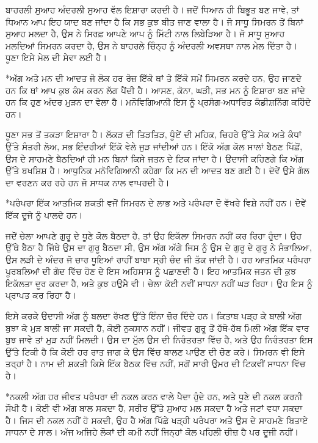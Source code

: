 \documentclass[12pt,a5paper,twoside]{book}  %
\makeatletter
\renewcommand\section{\@startsection{section}{1}{0pt}{1.2em}{0.6em}{\punjabifont\Large\bfseries}}%
\renewcommand\subsection{\@startsection{subsection}{2}{0pt}{1em}{0.5em}{\punjabifont\large\bfseries}}%
\makeatother
\begin{document}
{ਬਾਹਰਲੀ ਸੁਆਹ ਅੰਦਰਲੀ ਸੁਆਹ ਵੱਲ ਇਸ਼ਾਰਾ ਕਰਦੀ ਹੈ। ਜਦੋਂ ਧਿਆਨ ਹੀ ਬਿਭੂਤ ਬਣ ਜਾਵੇ, ਤਾਂ ਧਿਆਨ ਆਪ ਇਹ ਯਾਦ ਬਣ ਜਾਂਦਾ ਹੈ ਕਿ ਸਭ ਕੁਝ ਬੀਤ ਜਾਣ ਵਾਲਾ ਹੈ। ਜੋ ਸਾਧੂ ਸਿਮਰਨ ਤੋਂ ਬਿਨਾਂ ਸੁਆਹ ਮਲਦਾ ਹੈ, ਉਸ ਨੇ ਸਿਰਫ਼ ਆਪਣੇ ਆਪ ਨੂੰ ਮਿੱਟੀ ਨਾਲ ਲਿਬੇੜਿਆ ਹੈ। ਜੋ ਸਾਧੂ ਸੁਆਹ ਮਲਦਿਆਂ ਸਿਮਰਨ ਕਰਦਾ ਹੈ, ਉਸ ਨੇ ਬਾਹਰਲੇ ਚਿੰਨ੍ਹ ਨੂੰ ਅੰਦਰਲੀ ਅਵਸਥਾ ਨਾਲ ਮੇਲ ਦਿੱਤਾ ਹੈ। ਧੂਣਾ ਇਸੇ ਮੇਲ ਦੀ ਸੇਵਾ ਲਈ ਹੈ।


\subsection*{ਅੱਗ ਅਤੇ ਮਨ ਦੀ ਆਦਤ}
ਜੋ ਲੋਕ ਹਰ ਰੋਜ਼ ਇੱਕੋ ਥਾਂ ਤੇ ਇੱਕੋ ਸਮੇਂ ਸਿਮਰਨ ਕਰਦੇ ਹਨ, ਉਹ ਜਾਣਦੇ ਹਨ ਕਿ ਥਾਂ ਆਪ ਕੁਝ ਕੰਮ ਕਰਨ ਲੱਗ ਪੈਂਦੀ ਹੈ। ਆਸਣ, ਕੋਨਾ, ਘੜੀ, ਸਭ ਮਨ ਨੂੰ ਇਸ਼ਾਰਾ ਬਣ ਜਾਂਦੇ ਹਨ ਕਿ ਹੁਣ ਅੰਦਰ ਮੁੜਨ ਦਾ ਵੇਲਾ ਹੈ। ਮਨੋਵਿਗਿਆਨੀ ਇਸ ਨੂੰ ਪ੍ਰਸੰਗ-ਅਧਾਰਿਤ ਕੰਡੀਸ਼ਨਿੰਗ ਕਹਿੰਦੇ ਹਨ।

ਧੂਣਾ ਸਭ ਤੋਂ ਤਕੜਾ ਇਸ਼ਾਰਾ ਹੈ। ਲੱਕੜ ਦੀ ਤਿੜਤਿੜ, ਧੂੰਏਂ ਦੀ ਮਹਿਕ, ਚਿਹਰੇ ਉੱਤੇ ਸੇਕ ਅਤੇ ਕੰਧਾਂ ਉੱਤੇ ਸੰਤਰੀ ਲੋਅ, ਸਭ ਇੰਦਰੀਆਂ ਇੱਕੋ ਵੇਲੇ ਜੁੜ ਜਾਂਦੀਆਂ ਹਨ। ਇੱਕੋ ਅੱਗ ਕੋਲ ਸਾਲਾਂ ਬੈਠਣ ਪਿੱਛੋਂ, ਉਸ ਦੇ ਸਾਹਮਣੇ ਬੈਠਦਿਆਂ ਹੀ ਮਨ ਬਿਨਾਂ ਕਿਸੇ ਜਤਨ ਦੇ ਟਿਕ ਜਾਂਦਾ ਹੈ। ਉਦਾਸੀ ਕਹਿਣਗੇ ਕਿ ਅੱਗ ਉੱਤੇ ਬਖਸ਼ਿਸ਼ ਹੈ। ਆਧੁਨਿਕ ਮਨੋਵਿਗਿਆਨੀ ਕਹੇਗਾ ਕਿ ਮਨ ਦੀ ਆਦਤ ਬਣ ਗਈ ਹੈ। ਦੋਵੇਂ ਉਸੇ ਗੱਲ ਦਾ ਵਰਣਨ ਕਰ ਰਹੇ ਹਨ ਜੋ ਸਾਧਕ ਨਾਲ ਵਾਪਰਦੀ ਹੈ।


\section*{ਪਰੰਪਰਾ ਇੱਕ ਆਤਮਿਕ ਸ਼ਕਤੀ ਵਜੋਂ}
ਸਿਮਰਨ ਦੇ ਲਾਭ ਅਤੇ ਪਰੰਪਰਾ ਦੋ ਵੱਖਰੇ ਵਿਸ਼ੇ ਨਹੀਂ ਹਨ। ਦੋਵੇਂ ਇੱਕ ਦੂਜੇ ਨੂੰ ਪਾਲਦੇ ਹਨ।

ਜਦੋਂ ਚੇਲਾ ਆਪਣੇ ਗੁਰੂ ਦੇ ਧੂਣੇ ਕੋਲ ਬੈਠਦਾ ਹੈ, ਤਾਂ ਉਹ ਇਕੱਲਾ ਸਿਮਰਨ ਨਹੀਂ ਕਰ ਰਿਹਾ ਹੁੰਦਾ। ਉਹ ਉੱਥੇ ਬੈਠਾ ਹੈ ਜਿੱਥੇ ਉਸ ਦਾ ਗੁਰੂ ਬੈਠਦਾ ਸੀ, ਉਸ ਅੱਗ ਅੱਗੇ ਜਿਸ ਨੂੰ ਉਸ ਦੇ ਗੁਰੂ ਦੇ ਗੁਰੂ ਨੇ ਸੰਭਾਲਿਆ, ਉਸ ਲੜੀ ਦੇ ਅੰਦਰ ਜੋ ਚਾਰ ਧੂਇਆਂ ਰਾਹੀਂ ਬਾਬਾ ਸ੍ਰੀ ਚੰਦ ਜੀ ਤੱਕ ਜਾਂਦੀ ਹੈ। ਹਰ ਆਤਮਿਕ ਪਰੰਪਰਾ ਪੂਰਬਲਿਆਂ ਦੀ ਗੋਦ ਵਿੱਚ ਹੋਣ ਦੇ ਇਸ ਅਹਿਸਾਸ ਨੂੰ ਪਛਾਣਦੀ ਹੈ। ਇਹ ਆਤਮਿਕ ਜਤਨ ਦੀ ਕੁਝ ਇਕੱਲਤਾ ਦੂਰ ਕਰਦਾ ਹੈ, ਅਤੇ ਕੁਝ ਹਉਮੈ ਵੀ। ਚੇਲਾ ਕੋਈ ਨਵੀਂ ਸਾਧਨਾ ਨਹੀਂ ਘੜ ਰਿਹਾ। ਉਹ ਇਸ ਨੂੰ ਪ੍ਰਾਪਤ ਕਰ ਰਿਹਾ ਹੈ।

ਇਸੇ ਕਰਕੇ ਉਦਾਸੀ ਅੱਗ ਨੂੰ ਬਲਦਾ ਰੱਖਣ ਉੱਤੇ ਇੰਨਾ ਜ਼ੋਰ ਦਿੰਦੇ ਹਨ। ਕਿਤਾਬ ਪੜ੍ਹ ਕੇ ਬਾਲੀ ਅੱਗ ਬੁਝਾ ਕੇ ਮੁੜ ਬਾਲੀ ਜਾ ਸਕਦੀ ਹੈ, ਕੋਈ ਨੁਕਸਾਨ ਨਹੀਂ। ਜੀਵਤ ਗੁਰੂ ਤੋਂ ਹੱਥੋ-ਹੱਥ ਮਿਲੀ ਅੱਗ ਇੱਕ ਵਾਰ ਬੁਝ ਜਾਵੇ ਤਾਂ ਮੁੜ ਨਹੀਂ ਮਿਲਦੀ। ਉਸ ਦਾ ਮੁੱਲ ਉਸ ਦੀ ਨਿਰੰਤਰਤਾ ਵਿੱਚ ਹੈ, ਅਤੇ ਉਹ ਨਿਰੰਤਰਤਾ ਇਸ ਉੱਤੇ ਟਿਕੀ ਹੈ ਕਿ ਕੋਈ ਹਰ ਰਾਤ ਜਾਗ ਕੇ ਉਸ ਵਿੱਚ ਬਾਲਣ ਪਾਉਣ ਦੀ ਚੋਣ ਕਰੇ। ਸਿਮਰਨ ਵੀ ਇਸੇ ਤਰ੍ਹਾਂ ਹੈ। ਨਾਮ ਦੀ ਸ਼ਕਤੀ ਕਿਸੇ ਇੱਕ ਬੈਠਕ ਵਿੱਚ ਨਹੀਂ, ਸਗੋਂ ਸਾਰੀ ਉਮਰ ਦੀ ਟਿਕਵੀਂ ਸਾਧਨਾ ਵਿੱਚ ਹੈ।


\section*{ਨਕਲੀ ਅੱਗ}
ਹਰ ਜੀਵਤ ਪਰੰਪਰਾ ਦੀ ਨਕਲ ਕਰਨ ਵਾਲੇ ਪੈਦਾ ਹੁੰਦੇ ਹਨ, ਅਤੇ ਧੂਣੇ ਦੀ ਨਕਲ ਕਰਨੀ ਸੌਖੀ ਹੈ। ਕੋਈ ਵੀ ਅੱਗ ਬਾਲ ਸਕਦਾ ਹੈ, ਸਰੀਰ ਉੱਤੇ ਸੁਆਹ ਮਲ ਸਕਦਾ ਹੈ ਅਤੇ ਜਟਾਂ ਵਧਾ ਸਕਦਾ ਹੈ। ਜਿਸ ਦੀ ਨਕਲ ਨਹੀਂ ਹੋ ਸਕਦੀ, ਉਹ ਹੈ ਅੱਗ ਪਿੱਛੇ ਖੜ੍ਹੀ ਪਰੰਪਰਾ ਅਤੇ ਉਸ ਦੇ ਸਾਹਮਣੇ ਬਿਤਾਏ ਸਾਧਨਾ ਦੇ ਸਾਲ। ਅੱਜ ਅਜਿਹੇ ਲੋਕਾਂ ਦੀ ਕਮੀ ਨਹੀਂ ਜਿਨ੍ਹਾਂ ਕੋਲ ਪਹਿਲੀ ਚੀਜ਼ ਹੈ ਪਰ ਦੂਜੀ ਨਹੀਂ।

}
\end{document}
